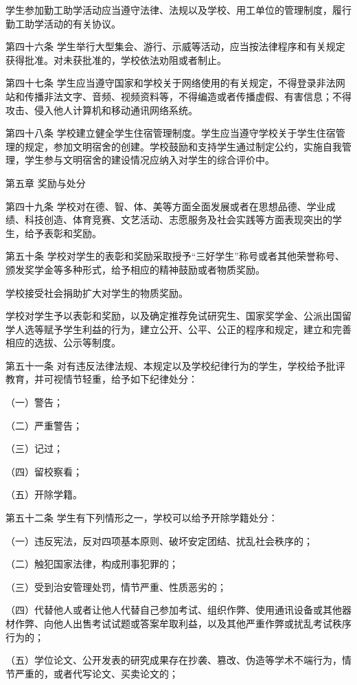 \documentclass[UTF8,12pt,a4paper]{report}
\begin{document}
学生参加勤工助学活动应当遵守法律、法规以及学校、用工单位的管理制度，履行勤工助学活动的有关协议。

第四十六条 学生举行大型集会、游行、示威等活动，应当按法律程序和有关规定获得批准。对未获批准的，学校依法劝阻或者制止。

第四十七条 学生应当遵守国家和学校关于网络使用的有关规定，不得登录非法网站和传播非法文字、音频、视频资料等，不得编造或者传播虚假、有害信息；不得攻击、侵入他人计算机和移动通讯网络系统。

第四十八条 学校建立健全学生住宿管理制度。学生应当遵守学校关于学生住宿管理的规定，参加文明宿舍的创建。学校鼓励和支持学生通过制定公约，实施自我管理，学生参与文明宿舍的建设情况应纳入对学生的综合评价中。



第五章 奖励与处分

第四十九条 学校对在德、智、体、美等方面全面发展或者在思想品德、学业成绩、科技创造、体育竞赛、文艺活动、志愿服务及社会实践等方面表现突出的学生，给予表彰和奖励。

第五十条 学校对学生的表彰和奖励采取授予“三好学生”称号或者其他荣誉称号、颁发奖学金等多种形式，给予相应的精神鼓励或者物质奖励。

学校接受社会捐助扩大对学生的物质奖励。

学校对学生予以表彰和奖励，以及确定推荐免试研究生、国家奖学金、公派出国留学人选等赋予学生利益的行为，建立公开、公平、公正的程序和规定，建立和完善相应的选拔、公示等制度。

第五十一条 对有违反法律法规、本规定以及学校纪律行为的学生，学校给予批评教育，并可视情节轻重，给予如下纪律处分：

（一）警告；

（二）严重警告；

（三）记过；

（四）留校察看；

（五）开除学籍。

第五十二条 学生有下列情形之一，学校可以给予开除学籍处分：

（一）违反宪法，反对四项基本原则、破坏安定团结、扰乱社会秩序的；

（二）触犯国家法律，构成刑事犯罪的；

（三）受到治安管理处罚，情节严重、性质恶劣的；

（四）代替他人或者让他人代替自己参加考试、组织作弊、使用通讯设备或其他器材作弊、向他人出售考试试题或答案牟取利益，以及其他严重作弊或扰乱考试秩序行为的；

（五）学位论文、公开发表的研究成果存在抄袭、篡改、伪造等学术不端行为，情节严重的，或者代写论文、买卖论文的；
\end{document}
